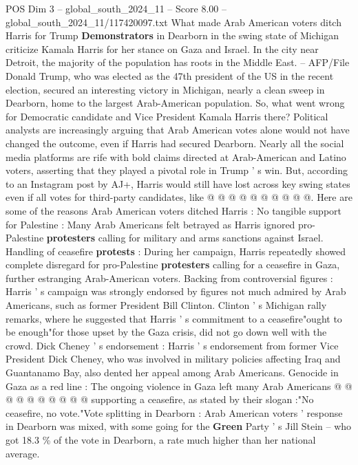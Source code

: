 \begin{textsample}{POS Dim 3 – global\_south\_2024\_11 – Score 8.00 – global\_south\_2024\_11/117420097.txt}  \label{ex:f3_pos_307}
What made Arab American voters ditch Harris for Trump \textbf{Demonstrators} in Dearborn in the swing state of Michigan criticize Kamala Harris for her stance on Gaza and Israel.
In the city near Detroit, the majority of the population has roots in the Middle East. -- AFP/File Donald Trump, who was elected as the 47th president of the US in the recent election, secured an interesting victory in Michigan, nearly a clean sweep in Dearborn, home to the largest Arab-American population.
So, what went wrong for Democratic candidate and Vice President Kamala Harris there?
Political analysts are increasingly arguing that Arab American votes alone would not have changed the outcome, even if Harris had secured Dearborn.
Nearly all the social media platforms are rife with bold claims directed at Arab-American and Latino voters, asserting that they played a pivotal role in Trump ' s win.
But, according to an Instagram post by AJ+, Harris would still have lost across key swing states even if all votes for third-party candidates, like @ @ @ @ @ @ @ @ @ @.
Here are some of the reasons Arab American voters ditched Harris : No tangible support for Palestine : Many Arab Americans felt betrayed as Harris ignored pro-Palestine \textbf{protesters} calling for military and arms sanctions against Israel.
Handling of ceasefire \textbf{protests} : During her campaign, Harris repeatedly showed complete disregard for pro-Palestine \textbf{protesters} calling for a ceasefire in Gaza, further estranging Arab-American voters.
Backing from controversial figures : Harris ' s campaign was strongly endorsed by figures not much admired by Arab Americans, such as former President Bill Clinton.
Clinton ' s Michigan rally remarks, where he suggested that Harris ' s commitment to a ceasefire"ought to be enough"for those upset by the Gaza crisis, did not go down well with the crowd.
Dick Cheney ' s endorsement : Harris ' s endorsement from former Vice President Dick Cheney, who was involved in military policies affecting Iraq and Guantanamo Bay, also dented her appeal among Arab Americans.
Genocide in Gaza as a red line : The ongoing violence in Gaza left many Arab Americans @ @ @ @ @ @ @ @ @ @ supporting a ceasefire, as stated by their slogan :"No ceasefire, no vote."Vote splitting in Dearborn : Arab American voters ' response in Dearborn was mixed, with some going for the \textbf{Green} Party ' s Jill Stein -- who got 18.3 \% of the vote in Dearborn, a rate much higher than her national average.

\end{textsample}
